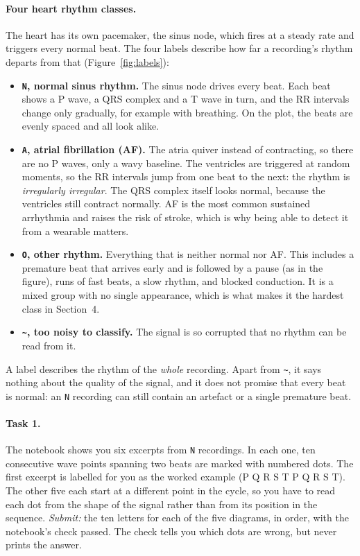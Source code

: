 \documentclass[12pt,article,oneside,linkcolour=blue]{oxengthesis}
\newcommand{\noise}{\texttt{\textasciitilde}}
\begin{document}
\paragraph{Four heart rhythm classes.} The heart has its own pacemaker, the sinus node, which
fires at a steady rate and triggers every normal beat. The four labels describe how far a
recording's rhythm departs from that (Figure~\ref{fig:labels}):
\begin{itemize}
  \item \textbf{\texttt{N}, normal sinus rhythm.} The sinus node drives every beat. Each beat
        shows a P wave, a QRS complex and a T wave in turn, and the RR intervals change only
        gradually, for example with breathing. On the plot, the beats are evenly spaced and all
        look alike.
  \item \textbf{\texttt{A}, atrial fibrillation (AF).} The atria quiver instead of contracting,
        so there are no P waves, only a wavy baseline. The ventricles are triggered at random
        moments, so the RR intervals jump from one beat to the next: the rhythm is
        \emph{irregularly irregular}. The QRS complex itself looks normal, because the ventricles
        still contract normally. AF is the most common sustained arrhythmia and raises the risk
        of stroke, which is why being able to detect it from a wearable matters.
  \item \textbf{\texttt{O}, other rhythm.} Everything that is neither normal nor AF. This
        includes a premature beat that arrives early and is followed by a pause (as in the
        figure), runs of fast beats, a slow rhythm, and blocked conduction. It is a mixed group
        with no single appearance, which is what makes it the hardest class in Section~4.
  \item \textbf{\noise, too noisy to classify.} The signal is so corrupted that no rhythm can be
        read from it.
\end{itemize}
A label describes the rhythm of the \emph{whole} recording. Apart from \noise, it says nothing
about the quality of the signal, and it does not promise that every beat is normal: an
\texttt{N} recording can still contain an artefact or a single premature beat.

\paragraph{Task 1.} The notebook shows you six excerpts from \texttt{N} recordings. In each
one, ten consecutive wave points spanning two beats are marked with numbered dots. The first
excerpt is labelled for you as the worked example (P Q R S T P Q R S T). The other five each
start at a different point in the cycle, so you have to read each dot from the shape of the
signal rather than from its position in the sequence. \emph{Submit:} the ten letters for each of
the five diagrams, in order, with the notebook's check passed. The check tells you which dots
are wrong, but never prints the answer.
\end{document}
